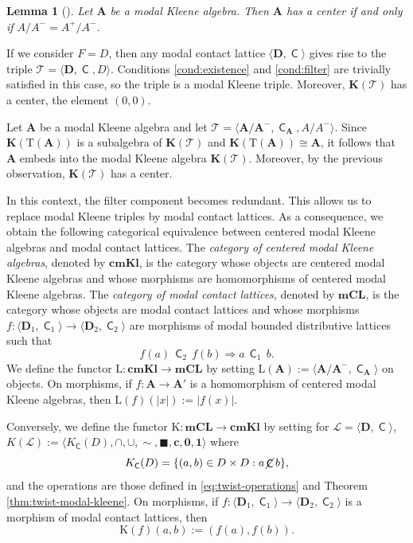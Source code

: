 \documentclass{article}
\newtheorem{lemma}[theorem]{Lemma}
\DeclareMathOperator{\con}{\mathsf{C}}
\DeclareMathOperator{\notcon}{\cancel{ \con}}
\newcommand{\cbf}{\mathbf{c}}
\newcommand{\one}{\mathbf{1}}
\newcommand{\zero}{\mathbf{0}}
\newcommand{\A}{\mathbf{A}}
\newcommand{\D}{\mathbf{D}}
\newcommand{\boxn}{\blacksquare}
\begin{document}
 \begin{lemma}[\cite{cignoli1986class}]
 \label{lem:pos-eq-quotient}
     Let $\A$ be a modal Kleene algebra. Then $\A$ has a center if and only if $A/A^{-} = A^{+} /A^{-}$.
 \end{lemma}

If we consider $F = D$, then any modal contact lattice $\langle \D, \con \rangle$ gives rise to the triple $\mathcal{T}=\langle \D, \con, D \rangle$. Conditions \eqref{cond:existence} and \eqref{cond:filter} are trivially satisfied in this case, so the triple is a modal Kleene triple. Moreover, $\mathbf{K}(\mathcal{T})$ has a center, the element $(0,0)$.

Let $\A$ be a modal Kleene algebra and let $\mathcal{T}=\langle \A/\A^{-}, \con_\A,A/A^{-}\rangle$. Since $\mathbf{K}(\mathrm{T}(\A))$ is a subalgebra of $\mathbf{K}(\mathcal{T})$ and $\mathbf{K}(\mathrm{T}(\A))\cong\A$, it follows that $\A$ embeds into the modal Kleene algebra $\mathbf{K}(\mathcal{T})$. Moreover, by the previous observation, $\mathbf{K}(\mathcal{T})$ has a center.

In this context, the filter component becomes redundant. This allows us to replace modal Kleene triples by modal contact lattices. As a consequence, we obtain the following categorical equivalence between centered modal Kleene algebras and modal contact lattices. The \emph{category of centered modal Kleene algebras}, denoted by $\mathbf{cmKl}$, is the category whose objects are centered modal Kleene
algebras and whose morphisms are homomorphisms of centered modal Kleene algebras. The \emph{category of modal contact lattices}, denoted by $\mathbf{mCL}$, is the category whose objects are modal contact lattices and whose morphisms $f:\langle\D_1,\con_1\rangle\to\langle\D_2,\con_2\rangle$ are morphisms of modal bounded distributive lattices such that
\[
f(a)\,\con_2\,f(b)\Longrightarrow a\,\con_1\,b.
\]
We define the functor $\mathrm{L}:\mathbf{cmKl}\longrightarrow\mathbf{mCL}$
by setting $\mathrm{L}(\A):=\langle \A/\A^{-},\con_\A\rangle$ on objects. On morphisms, if $f:\A\to\A'$
is a homomorphism of centered modal Kleene algebras, then $\mathrm{L}(f)(|x|):=|f(x)|$.

Conversely, we define the functor $\mathrm{K}:\mathbf{mCL}\longrightarrow\mathbf{cmKl}$
by setting for $\mathcal{L}=\langle\D,\con\rangle $, $K(\mathcal{L}):=\langle K_{\con}(D),\cap,\cup,\sim ,\boxn,\cbf,\zero,\one\rangle$ where 
\[
K_{\con}(D)=\{(a,b)\in D\times D: a\notcon b\},
\]
and the operations are those defined in \ref{eq:twist-operations} and Theorem \ref{thm:twist-modal-kleene}. On morphisms, if $f:\langle\D_1,\con_1\rangle\to\langle\D_2,\con_2\rangle$
is a morphism of modal contact lattices, then
\[
\mathrm{K}(f)(a,b):=(f(a),f(b)).
\]
\end{document}
